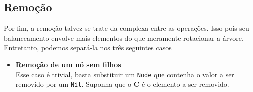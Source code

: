 \subsection{Remoção}

Por fim, a remoção talvez se trate da complexa entre as operações. Isso pois seu balanceamento envolve mais elementos do que meramente rotacionar a árvore. Entretanto, podemos separá-la nos três seguintes casos

\begin{itemize}
	\item \textbf{Remoção de um nó sem filhos} \\
		Esse caso é trivial, basta substituir um \texttt{Node} que contenha o valor a ser removido por um \texttt{Nil}. Suponha que o \textbf{C} é o elemento a ser removido.


\end{itemize}
